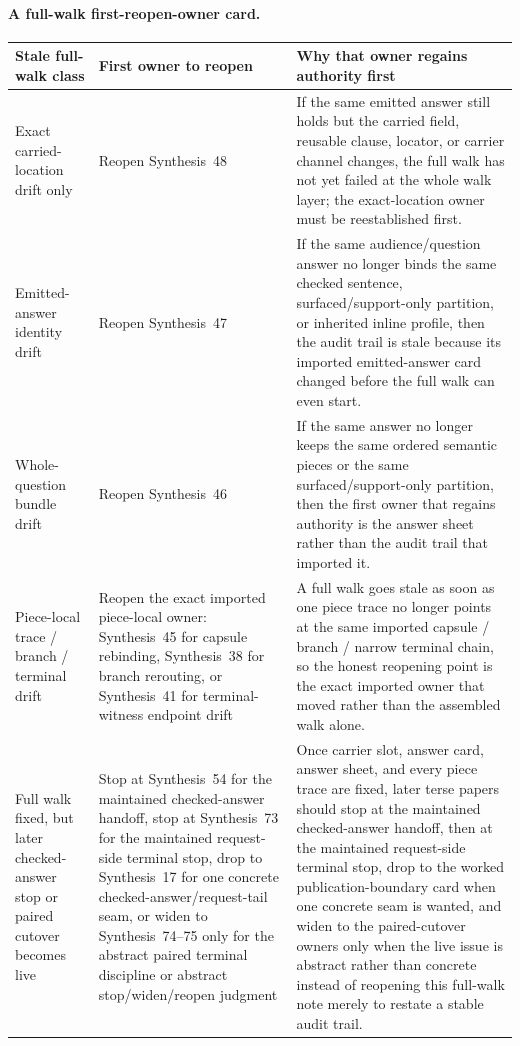 \documentclass[11pt]{article}
\begin{document}
\paragraph{A full-walk first-reopen-owner card.}
\begin{table}[t]
\centering
\small
\begin{tabularx}{\linewidth}{@{}>{\raggedright\arraybackslash}X>{\raggedright\arraybackslash}X>{\raggedright\arraybackslash}X@{}}
\toprule
Stale full-walk class & First owner to reopen & Why that owner regains authority first \\
\midrule
Exact carried-location drift only & Reopen Synthesis~48 & If the same emitted answer still holds but the carried field, reusable clause, locator, or carrier channel changes, the full walk has not yet failed at the whole walk layer; the exact-location owner must be reestablished first. \\
Emitted-answer identity drift & Reopen Synthesis~47 & If the same audience/question answer no longer binds the same checked sentence, surfaced/support-only partition, or inherited inline profile, then the audit trail is stale because its imported emitted-answer card changed before the full walk can even start. \\
Whole-question bundle drift & Reopen Synthesis~46 & If the same answer no longer keeps the same ordered semantic pieces or the same surfaced/support-only partition, then the first owner that regains authority is the answer sheet rather than the audit trail that imported it. \\
Piece-local trace / branch / terminal drift & Reopen the exact imported piece-local owner: Synthesis~45 for capsule rebinding, Synthesis~38 for branch rerouting, or Synthesis~41 for terminal-witness endpoint drift & A full walk goes stale as soon as one piece trace no longer points at the same imported capsule / branch / narrow terminal chain, so the honest reopening point is the exact imported owner that moved rather than the assembled walk alone. \\
Full walk fixed, but later checked-answer stop or paired cutover becomes live & Stop at Synthesis~54 for the maintained checked-answer handoff, stop at Synthesis~73 for the maintained request-side terminal stop, drop to Synthesis~17 for one concrete checked-answer/request-tail seam, or widen to Synthesis~74--75 only for the abstract paired terminal discipline or abstract stop/widen/reopen judgment & Once carrier slot, answer card, answer sheet, and every piece trace are fixed, later terse papers should stop at the maintained checked-answer handoff, then at the maintained request-side terminal stop, drop to the worked publication-boundary card when one concrete seam is wanted, and widen to the paired-cutover owners only when the live issue is abstract rather than concrete instead of reopening this full-walk note merely to restate a stable audit trail. \\

\end{tabularx}
\end{table}
\end{document}
